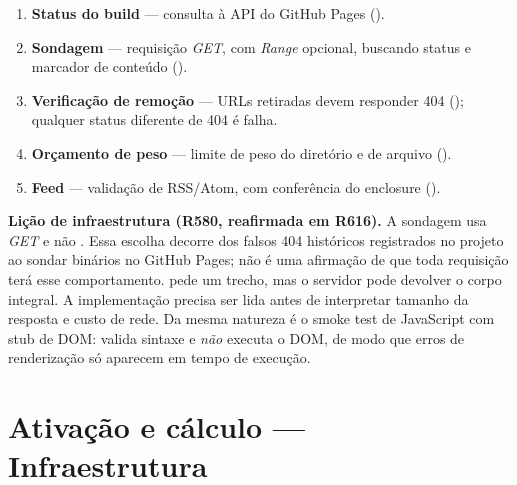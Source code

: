 \begin{metodo}
\begin{enumerate}[leftmargin=1.4em,itemsep=1pt]
  \item \textbf{Status do build} --- consulta à API do GitHub Pages
        ().
  \item \textbf{Sondagem} --- requisição \emph{GET}, com \emph{Range} opcional,
        buscando status e marcador de conteúdo ().
  \item \textbf{Verificação de remoção} --- URLs retiradas devem responder 404
        (); qualquer status diferente de 404 é falha.
  \item \textbf{Orçamento de peso} --- limite de peso do diretório e de arquivo
        ().
  \item \textbf{Feed} --- validação de RSS/Atom, com conferência do enclosure
        ().
\end{enumerate}
\end{metodo}

\begin{aviso}
\textbf{Lição de infraestrutura (R580, reafirmada em R616).} A sondagem usa
\emph{GET} e não . Essa escolha decorre dos falsos 404 históricos
registrados no projeto ao sondar binários no GitHub Pages; não é uma afirmação
de que toda requisição  terá esse comportamento.  pede
um trecho, mas o servidor pode devolver o corpo integral. A implementação
precisa ser lida antes de interpretar tamanho da resposta e custo de rede.
Da mesma natureza é o smoke test de JavaScript com stub de DOM: 
valida sintaxe e \emph{não} executa o DOM, de modo que erros de renderização só
aparecem em tempo de execução.
\end{aviso}



\section[Ativação e cálculo]{Ativação e cálculo — Infraestrutura}


